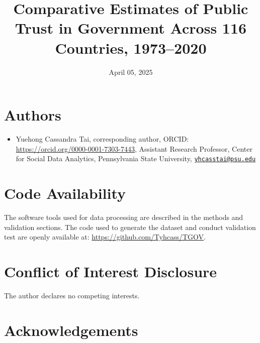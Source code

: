 \documentclass[
  12pt,
]{article}
\title{Comparative Estimates of Public Trust in Government Across 116 Countries, 1973--2020}
\author{}
\date{\vspace{-2.5em}April 05, 2025}
\providecommand{\tightlist}{%
  \setlength{\itemsep}{0pt}\setlength{\parskip}{0pt}}
\begin{document}
\maketitle


\section*{Authors}\label{authors}

\begin{itemize}
\tightlist
\item
  Yuehong Cassandra Tai, corresponding author, ORCID: \url{https://orcid.org/0000-0001-7303-7443}, Assistant Research Professor, Center for Social Data Analytics, Pennsylvania State University, \href{mailto:yhcasstai@psu.edu}{\nolinkurl{yhcasstai@psu.edu}}
\end{itemize}

\section{Code Availability}\label{code-availability}

The software tools used for data processing are described in the methods and validation sections.
The code used to generate the dataset and conduct validation test are openly available at: \url{https://github.com/Tyhcass/TGOV}.

\section{Conflict of Interest Disclosure}\label{conflict-of-interest-disclosure}

The author declares no competing interests.

\section{Acknowledgements}\label{acknowledgements}

\pagebreak

\renewcommand{\baselinestretch}{1}
\selectfont
\maketitle
\renewcommand{\baselinestretch}{1.5}
\selectfont
\end{document}

